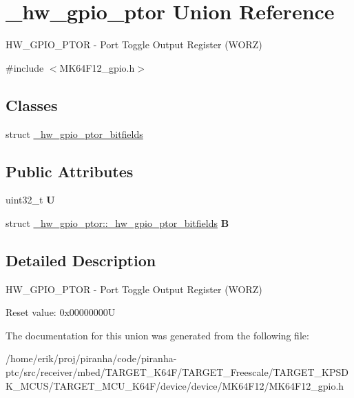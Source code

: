 \hypertarget{union__hw__gpio__ptor}{}\section{\+\_\+hw\+\_\+gpio\+\_\+ptor Union Reference}
\label{union__hw__gpio__ptor}


H\+W\+\_\+\+G\+P\+I\+O\+\_\+\+P\+T\+OR -\/ Port Toggle Output Register (W\+O\+RZ)  




{\ttfamily \#include $<$M\+K64\+F12\+\_\+gpio.\+h$>$}

\subsection*{Classes}
\begin{DoxyCompactItemize}
\item 
struct \hyperlink{struct__hw__gpio__ptor_1_1__hw__gpio__ptor__bitfields}{\+\_\+hw\+\_\+gpio\+\_\+ptor\+\_\+bitfields}
\end{DoxyCompactItemize}
\subsection*{Public Attributes}
\begin{DoxyCompactItemize}
\item 
uint32\+\_\+t {\bfseries U}\hypertarget{union__hw__gpio__ptor_ac23b5c288145e18bafcf606207ef1714}{}\label{union__hw__gpio__ptor_ac23b5c288145e18bafcf606207ef1714}

\item 
struct \hyperlink{struct__hw__gpio__ptor_1_1__hw__gpio__ptor__bitfields}{\+\_\+hw\+\_\+gpio\+\_\+ptor\+::\+\_\+hw\+\_\+gpio\+\_\+ptor\+\_\+bitfields} {\bfseries B}\hypertarget{union__hw__gpio__ptor_a6578eb68cf236d5ee70caebfb87b8e37}{}\label{union__hw__gpio__ptor_a6578eb68cf236d5ee70caebfb87b8e37}

\end{DoxyCompactItemize}


\subsection{Detailed Description}
H\+W\+\_\+\+G\+P\+I\+O\+\_\+\+P\+T\+OR -\/ Port Toggle Output Register (W\+O\+RZ) 

Reset value\+: 0x00000000U 

The documentation for this union was generated from the following file\+:\begin{DoxyCompactItemize}
\item 
/home/erik/proj/piranha/code/piranha-\/ptc/src/receiver/mbed/\+T\+A\+R\+G\+E\+T\+\_\+\+K64\+F/\+T\+A\+R\+G\+E\+T\+\_\+\+Freescale/\+T\+A\+R\+G\+E\+T\+\_\+\+K\+P\+S\+D\+K\+\_\+\+M\+C\+U\+S/\+T\+A\+R\+G\+E\+T\+\_\+\+M\+C\+U\+\_\+\+K64\+F/device/device/\+M\+K64\+F12/M\+K64\+F12\+\_\+gpio.\+h\end{DoxyCompactItemize}
